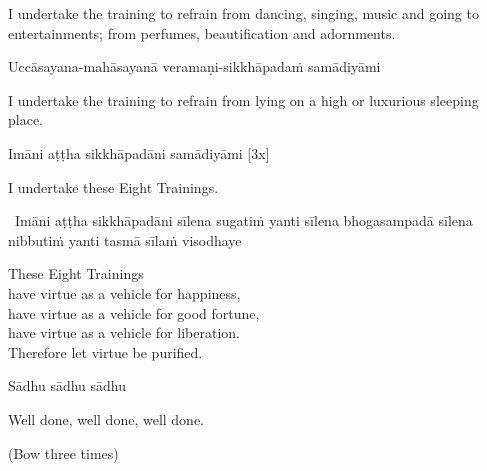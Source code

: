 \begin{english-hang}
  I undertake the training to refrain from dancing, singing, music and going to entertainments; from perfumes, beautification and adornments.\hyperlink{endnote143-appendix}{\hypertarget{endnote143-body}{}}
\end{english-hang}

Uccāsayana-mahāsayanā veramaṇi-sikkhāpadaṁ samādiyāmi

\begin{english-hang}
  I undertake the training to refrain from lying on a high or luxurious sleeping place.
\end{english-hang}

Imāni aṭṭha sikkhāpadāni samādiyāmi \hfill{[3x]}

\begin{english}
  I undertake these Eight Trainings.
\end{english}

\begin{pali-hang}
  \anglebracketleft\ \hspace{-0.5mm}Imāni aṭṭha sikkhāpadāni sīlena sugatiṁ yanti sīlena bhogasampadā sīlena nibbutiṁ yanti tasmā sīlaṁ visodhaye \hspace{-0.5mm}\anglebracketright\
\end{pali-hang}

\begin{english-verses}
  These Eight Trainings\\
  have virtue as a vehicle for happiness,\\
  have virtue as a vehicle for good fortune,\\
  have virtue as a vehicle for liberation.\\
  Therefore let virtue be purified.\hyperlink{endnote144-appendix}{\hypertarget{endnote144-body}{}}
\end{english-verses}

Sādhu sādhu sādhu

\begin{english}
  Well done, well done, well done.
\end{english}

(Bow three times)

\clearpage
